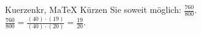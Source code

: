 \begin{MAufgabe}{Kuerzen}{kr, MaTeX}
K\"urzen Sie soweit m\"oglich: $\frac{760}{800}$.\\ 
\ifLsg\MLoesung
\quad $\frac{760}{800}=\frac{(40)\cdot(19)}{(40)\cdot(20)}=\frac{19}{20}$.\else\relax\fi
 \end{MAufgabe}